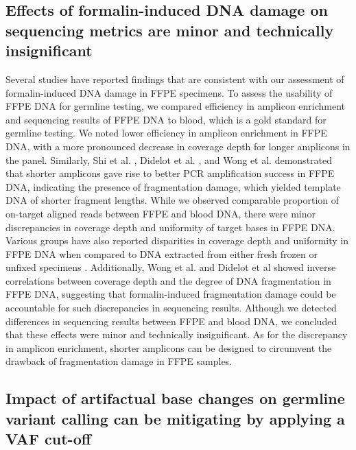 \subsection{Effects of formalin-induced DNA damage on sequencing metrics are minor and technically insignificant}

Several studies have reported findings that are consistent with our assessment of formalin-induced DNA damage in FFPE specimens. To assess the usability of FFPE DNA for germline testing, we compared efficiency in amplicon enrichment and sequencing results of FFPE DNA to blood, which is a gold standard for germline testing. We noted lower efficiency in amplicon enrichment in FFPE DNA, with a more pronounced decrease in coverage depth for longer amplicons in the panel. Similarly, Shi et al. \cite{Shi2002}, Didelot et al. \cite{Didelot2013}, and Wong et al. \cite{Wong2013} demonstrated that shorter amplicons gave rise to better PCR amplification success in FFPE DNA, indicating the presence of fragmentation damage, which yielded template DNA of shorter fragment lengths. While we observed comparable proportion of on-target aligned reads between FFPE and blood DNA, there were minor discrepancies in coverage depth and uniformity of target bases in FFPE DNA. Various groups have also reported disparities in coverage depth and uniformity in FFPE DNA when compared to DNA extracted from either fresh frozen or unfixed specimens \cite{Wong2013, Betge2015, Spencer2013}. Additionally, Wong et al. \cite{Wong2014} and Didelot et al \cite{Didelot2013} showed inverse correlations between coverage depth and the degree of DNA fragmentation in FFPE DNA, suggesting that formalin-induced fragmentation damage could be accountable for such discrepancies in sequencing results. Although we detected differences in sequencing results between FFPE and blood DNA, we concluded that these effects were minor and technically insignificant. As for the discrepancy in amplicon enrichment, shorter amplicons can be designed to circumvent the drawback of fragmentation damage in FFPE samples.

\subsection{Impact of artifactual base changes on germline variant calling can be mitigating by applying a VAF cut-off}

